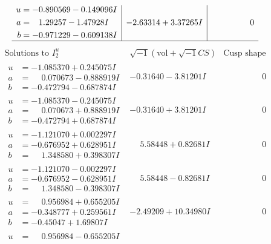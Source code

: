 \documentclass[1p]{elsarticle_modified}
\theoremstyle{definition}
\newcommand{\I}{\sqrt{-1}}
\begin{document}
$$\begin{array}{c|c|c}
\begin{aligned}
u &= -0.890569 - 0.149096 I \\
a &= \phantom{-}1.29257 - 1.47928 I \\
b &= -0.971229 - 0.609138 I\end{aligned}
 & -2.63314 + 3.37265 I & \phantom{-0.000000 } 0\\
 \hline 
 \end{array}$$\newpage$$\begin{array}{c|c|c}  
\text{Solutions to }I^u_{2}& \I (\text{vol} + \sqrt{-1}CS) & \text{Cusp shape}\\
 \hline 
\begin{aligned}
u &= -1.085370 + 0.245075 I \\
a &= \phantom{-}0.070673 - 0.888919 I \\
b &= -0.472794 - 0.687874 I\end{aligned}
 & -0.31640 - 3.81201 I & \phantom{-0.000000 } 0 \\ \hline\begin{aligned}
u &= -1.085370 - 0.245075 I \\
a &= \phantom{-}0.070673 + 0.888919 I \\
b &= -0.472794 + 0.687874 I\end{aligned}
 & -0.31640 + 3.81201 I & \phantom{-0.000000 } 0 \\ \hline\begin{aligned}
u &= -1.121070 + 0.002297 I \\
a &= -0.676952 + 0.628951 I \\
b &= \phantom{-}1.348580 + 0.398307 I\end{aligned}
 & \phantom{-}5.58448 + 0.82681 I & \phantom{-0.000000 } 0 \\ \hline\begin{aligned}
u &= -1.121070 - 0.002297 I \\
a &= -0.676952 - 0.628951 I \\
b &= \phantom{-}1.348580 - 0.398307 I\end{aligned}
 & \phantom{-}5.58448 - 0.82681 I & \phantom{-0.000000 } 0 \\ \hline\begin{aligned}
u &= \phantom{-}0.956984 + 0.655205 I \\
a &= -0.348777 + 0.259561 I \\
b &= -0.45047 + 1.69807 I\end{aligned}
 & -2.49209 + 10.34980 I & \phantom{-0.000000 } 0 \\ \hline\begin{aligned}
u &= \phantom{-}0.956984 - 0.655205 I \\

\end{aligned}
\end{array}$$
\end{document}
